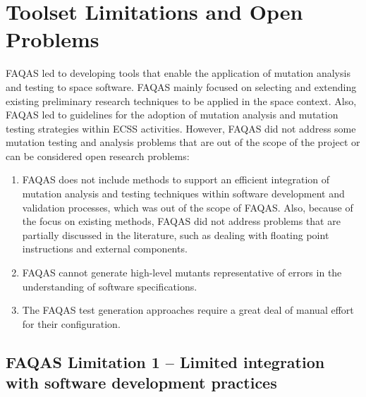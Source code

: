 
\chapter{Toolset Limitations and Open Problems}
\label{sec:limitations}

FAQAS led to developing tools that enable the application of mutation analysis and testing to space software. FAQAS mainly focused on selecting and extending existing preliminary research techniques to be applied in the space context. Also, FAQAS led to guidelines for the adoption of mutation analysis and mutation testing strategies within ECSS activities. However, FAQAS did not address some mutation testing and analysis problems that are out of the scope of the project or can be considered open research problems: 
\begin{enumerate}
\item FAQAS does not include methods to support an efficient integration of mutation analysis and testing techniques within software development and validation processes, which was out of the scope of FAQAS. Also, because of the focus on existing methods, FAQAS did not address problems that are partially discussed in the literature, such as dealing with floating point instructions and external components.
\item FAQAS cannot generate high-level mutants representative of errors in the understanding of software specifications.
\item The FAQAS test generation approaches require a great deal of manual effort for their configuration.
\end{enumerate}

\section*{FAQAS Limitation 1 – Limited integration with software development practices}

